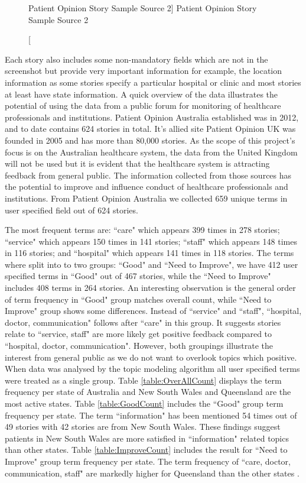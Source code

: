 \documentclass[11pt,twoside]{report}
\begin{document}
\begin{figure}[h]
    \begin{center}
    \caption
    [Patient Opinion Story Sample Source 2]
    {
    Patient Opinion Story Sample Source 2
    \label{Figure3}
    }
    \end{center}
\end{figure}
Each story also includes some non-mandatory fields which are not in the screenshot but provide very important information for example, the location information as some stories specify a particular hospital or clinic and most stories at least have state information. A quick overview of the data illustrates the potential of using the data from a public forum for monitoring of healthcare professionals and institutions. Patient Opinion Australia established was in 2012, and to date contains 624 stories in total. It's allied site Patient Opinion UK was founded in 2005 and has more than 80,000 stories. As the scope of this project's focus is on the Australian healthcare system, the data from the United Kingdom will not be used but it is evident that the healthcare system is attracting feedback from general public. The information collected from those sources has the potential to improve and influence conduct of healthcare professionals and institutions. From Patient Opinion Australia we collected 659 unique terms in user specified field out of 624 stories. 

The most frequent terms are: ``care" which appears 399 times in 278 stories; ``service" which appears 150 times in 141 stories; ``staff" which appears 148 times in 116 stories; and ``hospital" which appears 141 times in 118 stories. The terms where split into to two groups: ``Good" and ``Need to Improve", we have 412 user specified terms in ``Good" out of 467 stories, while the ``Need to Improve" includes 408 terms in 264 stories. An interesting observation is the general order of term frequency in ``Good" group matches overall count, while ``Need to Improve" group shows some differences. Instead of ``service" and ``staff", ``hospital, doctor, communication" follows after ``care" in this group. It suggests stories relate to ``service, staff" are more likely get positive feedback compared to ``hospital, doctor, communication". However, both groupings illustrate the interest from general public as we do not want to overlook topics which positive. When data was analysed by the topic modeling algorithm all user specified terms were treated as a single group. Table \ref{table:OverAllCount} displays the term frequency per state of Australia and New South Wales and Queensland are the most active states. Table \ref{table:GoodCount} includes the ``Good" group term frequency per state. The term ``information" has been mentioned 54 times out of 49 stories with 42 stories are from New South Wales. These findings suggest patients in New South Wales are more satisfied in ``information" related topics than other states. Table \ref{table:ImproveCount} includes the result for ``Need to Improve" group term frequency per state. The term frequency of  ``care, doctor, communication, staff" are markedly higher for Queensland than the other states . 
\end{document}
